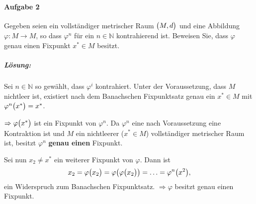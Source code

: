 \documentclass{scrreprt}
\begin{document}
\newpage
\paragraph{Aufgabe 2} Gegeben seien ein vollständiger metrischer Raum
$\qty\big(M, d)$ und eine Abbildung $\varphi \colon M \to M$, so dass
$\varphi^n$ für ein $n \in \mathbb{N}$ kontrahierend ist.
Beweisen Sie, dass $\varphi$ genau einen Fixpunkt $x^* \in M$ besitzt.

\subparagraph{Lösung:} Sei $n \in \mathbb{N}$ so gewählt, dass $\varphi^i$
kontrahiert.
Unter der Voraussetzung, dass $M$ nichtleer ist, existiert nach dem Banachschen
Fixpunktsatz genau ein $x^* \in M$ mit $\varphi^n\qty\big(x^*) = x^*$.
$\Rightarrow \varphi\qty\big(x^*)$ ist ein Fixpunkt von $\varphi^n$.
Da $\varphi^n$ eine nach Voraussetzung eine Kontraktion ist und $M$
ein nichtleerer ($x^* \in M$) vollständiger metrischer Raum ist, besitzt
$\varphi^n$ \textbf{genau einen} Fixpunkt.
Sei nun $x_2 \ne x^*$ ein weiterer Fixpunkt von $\varphi$. Dann ist
\[
  x_2 = \varphi\qty\big(x_2) = \varphi\qty\big(\varphi\qty\big(x_2))
  = \ldots = \varphi^n\qty\big(x^2),
\]
ein Widerspruch zum Banachschen Fixpunktsatz.
$\Rightarrow \varphi$ besitzt genau einen Fixpunkt.
\end{document}
